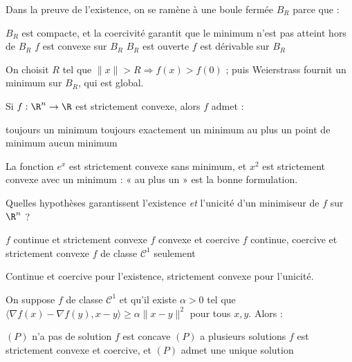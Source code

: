 \begin{question}
Dans la preuve de l'existence, on se ramène à une boule fermée $B_R$ parce que :
\begin{reponses}
  \bonne $B_R$ est compacte, et la coercivité garantit que le minimum n'est pas atteint hors de $B_R$
  \mauvaise $f$ est convexe sur $B_R$
  \mauvaise $B_R$ est ouverte
  \mauvaise $f$ est dérivable sur $B_R$
\end{reponses}
\begin{explication}
On choisit $R$ tel que $\|x\|>R\Rightarrow f(x)>f(0)$ ; puis Weierstrass fournit un minimum sur $B_R$, qui est global.
\end{explication}
\end{question}

\begin{question}
Si $f:\R^n\to\R$ est strictement convexe, alors $f$ admet :
\begin{reponses}
  \mauvaise toujours un minimum
  \mauvaise toujours exactement un minimum
  \bonne au plus un point de minimum
  \mauvaise aucun minimum
\end{reponses}
\begin{explication}
La fonction $e^x$ est strictement convexe sans minimum, et $x^2$ est strictement convexe avec un minimum : « au plus un » est la bonne formulation.
\end{explication}
\end{question}

\begin{question}
Quelles hypothèses garantissent l'existence \emph{et} l'unicité d'un minimiseur de $f$ sur $\R^n$ ?
\begin{reponses}
  \mauvaise $f$ continue et strictement convexe
  \mauvaise $f$ convexe et coercive
  \bonne $f$ continue, coercive et strictement convexe
  \mauvaise $f$ de classe $\mathcal C^1$ seulement
\end{reponses}
\begin{explication}
Continue et coercive pour l'existence, strictement convexe pour l'unicité.
\end{explication}
\end{question}

\begin{question}
On suppose $f$ de classe $\mathcal C^1$ et qu'il existe $\alpha>0$ tel que $\langle\nabla f(x)-\nabla f(y),x-y\rangle\ge\alpha\|x-y\|^2$ pour tous $x,y$. Alors :
\begin{reponses}
  \mauvaise $(P)$ n'a pas de solution
  \mauvaise $f$ est concave
  \mauvaise $(P)$ a plusieurs solutions
  \bonne $f$ est strictement convexe et coercive, et $(P)$ admet une unique solution
\end{reponses}
\end{question}

